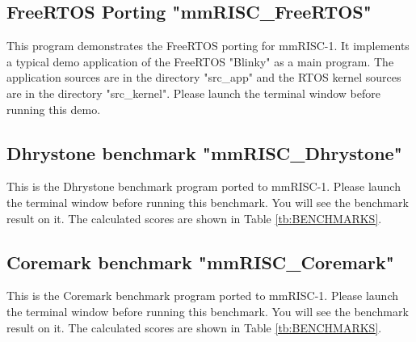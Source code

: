 \subsection{FreeRTOS Porting "mmRISC\_FreeRTOS"}
This program demonstrates the FreeRTOS porting for mmRISC-1. It implements a typical demo application of the FreeRTOS "Blinky" as a main program. The application sources are in the directory "src\_app" and the RTOS kernel sources are in the directory "src\_kernel". Please launch the terminal window before running this demo.

\subsection{Dhrystone benchmark "mmRISC\_Dhrystone"}
This is the Dhrystone benchmark program ported to mmRISC-1. Please launch the terminal window before running this benchmark. You will see the benchmark result on it. The calculated scores are shown in Table \ref{tb:BENCHMARKS}.

\subsection{Coremark benchmark "mmRISC\_Coremark"}
This is the Coremark benchmark program ported to mmRISC-1. Please launch the terminal window before running this benchmark. You will see the benchmark result on it. The calculated scores are shown in Table \ref{tb:BENCHMARKS}.

